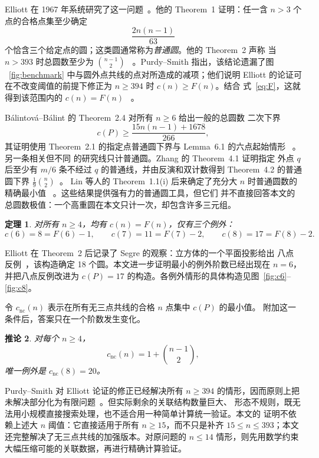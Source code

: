 \documentclass[11pt,a4paper]{ctexart}
\newtheorem{theorem}{定理}[section]
\newtheorem{corollary}[theorem]{推论}
\theoremstyle{definition}
\begin{document}
Elliott 在 1967 年系统研究了这一问题~\cite{elliott}。他的 Theorem~1 证明：任一含 $n>3$
个点的合格点集至少确定
\[
\frac{2n(n-1)}{63}
\]
个恰含三个给定点的圆；这类圆通常称为\emph{普通圆}。他的 Theorem~2 声称
当 $n>393$ 时总圆数至少为 $\binom{n-1}{2}$
~\cite[Theorems~1--2]{elliott}。Purdy--Smith 指出，该结论遗漏了图
~\ref{fig:benchmark} 中与圆外点共线的点对所造成的减项；他们说明 Elliott
的论证可在不改变阈值的前提下修正为 $n\ge394$ 时 $c(n)\ge F(n)$。结合
式~\eqref{eq:F}，这就得到该范围内的 $c(n)=F(n)$
~\cite[\S2.1]{purdy-smith}。

B\'alintov\'a--B\'alint 的 Theorem~2.4 对所有 $n\ge6$ 给出一般的总圆数
二次下界
\[
c(P)\ge \frac{15n(n-1)+1678}{266},
\]
其证明使用 Theorem~2.1 的指定点普通圆下界与 Lemma~6.1 的六点起始情形
~\cite[Theorem 2.1, Theorem 2.4 and Lemma 6.1]{balintova}。另一条相关但不同
的研究线只计普通圆。Zhang 的 Theorem~4.1 证明指定
外点 $q$ 后至少有 $m/6$ 条不经过 $q$ 的普通线，并由反演和双计数得到
Theorem~4.2 的普通圆下界 $\frac19\binom n2$~\cite[Theorems 4.1--4.2]{zhang}。
Lin 等人的 Theorem~1.1(i) 后来确定了充分大 $n$ 时普通圆数的精确最小值
~\cite[Theorem 1.1(i)]{lin-et-al}。这些结果提供强有力的普通圆工具，但它们
并不直接回答本文的总圆数极值：一个高重圆在本文只计一次，却包含许多三元组。

\begin{theorem}\label{thm:main}
对所有 $n\ge4$，均有 $c(n)=F(n)$，仅有三个例外：
\[
c(6)=8=F(6)-1,\qquad c(7)=11=F(7)-2,\qquad
c(8)=17=F(8)-2.
\]
\end{theorem}

Elliott 在 Theorem~2 后记录了 Segre 的观察：立方体的一个平面投影给出
八点反例~\cite[p.~182, discussion following Theorem~2]{elliott}，该构造确定
18 个圆。本文进一步证明最小的例外阶数已经出现在 $n=6$，并把八点反例改进为
$c(P)=17$ 的构造。各例外情形的具体构造见图~\ref{fig:c6}--\ref{fig:c8}。

令 $c_{\mathrm{nc}}(n)$ 表示在所有无三点共线的合格 $n$ 点集中 $c(P)$ 的最小值。
附加这一条件后，答案只在一个阶数发生变化。

\begin{corollary}\label{thm:no-three}
对每个 $n\ge4$，
\[
c_{\mathrm{nc}}(n)=1+\binom{n-1}{2},
\]
唯一例外是 $c_{\mathrm{nc}}(8)=20$。
\end{corollary}

Purdy--Smith 对 Elliott 论证的修正已经解决所有 $n\ge394$ 的情形，因而原则上把
未解决部分化为有限问题~\cite[\S2.1]{purdy-smith}。但实际剩余的关联结构数量巨大、
形态不规则，既无法用小规模直接搜索处理，也不适合用一种简单计算统一验证。本文的
证明不依赖上述大 $n$ 阈值：它直接适用于所有 $n\ge15$，而不只是补齐
$15\le n\le393$；本文还完整解决了无三点共线的加强版本。对原问题的 $n\le14$
情形，则先用数学约束大幅压缩可能的关联数据，再进行精确计算验证。
\end{document}
